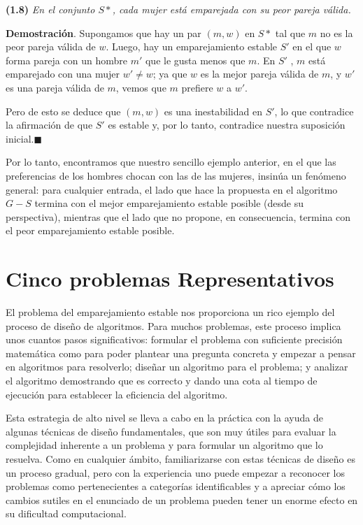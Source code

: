 \documentclass[a4paper, 12pt]{book}
\theoremstyle{dotless}
\begin{document}
\vspace{3mm}
\noindent\textbf{(1.8)} \textit{En el conjunto $S*$, cada mujer está emparejada con su peor pareja válida.}
\vspace{2mm}

\textbf{Demostración}. Supongamos que hay un par $(m, w)$ en $S*$ tal que $m$ no es la peor pareja válida de $w$. Luego, hay un emparejamiento estable $S'$ en el que $w$ forma pareja con un hombre $m'$ que le gusta menos que $m$. En $S'$ , $m$ está emparejado con una mujer $w'\neq w$; ya que $w$ es la mejor pareja válida de $m$, y $w'$ es una pareja válida de $m$, vemos que $m$ prefiere $w$ a $w'$.

Pero de esto se deduce que $(m, w)$ es una inestabilidad en $S'$, lo que contradice la afirmación de que $S'$ es estable y, por lo tanto, contradice nuestra suposición inicial.$ \blacksquare $

Por lo tanto, encontramos que nuestro sencillo ejemplo anterior, en el que las preferencias de los hombres chocan con las de las mujeres, insinúa un fenómeno general: para cualquier entrada, el lado que hace la propuesta en el algoritmo $G-S$ termina con el mejor emparejamiento estable posible (desde su perspectiva), mientras que el lado que no propone, en consecuencia, termina con el peor emparejamiento estable posible.

\section{Cinco problemas Representativos}

El problema del emparejamiento estable nos proporciona un rico ejemplo del proceso de diseño de algoritmos. Para muchos problemas, este proceso implica unos cuantos pasos significativos: formular el problema con suficiente precisión matemática como para poder plantear una pregunta concreta y empezar a pensar en algoritmos para resolverlo; diseñar un algoritmo para el problema; y analizar el algoritmo demostrando que es correcto y dando una cota al tiempo de ejecución para establecer la eficiencia del algoritmo.

Esta estrategia de alto nivel se lleva a cabo en la práctica con la ayuda de algunas técnicas de diseño fundamentales, que son muy útiles para evaluar la complejidad inherente a un problema y para formular un algoritmo que lo resuelva. Como en cualquier ámbito, familiarizarse con estas técnicas de diseño es un proceso gradual, pero con la experiencia uno puede empezar a reconocer los problemas como pertenecientes a categorías identificables y a apreciar cómo los cambios sutiles en el enunciado de un problema pueden tener un enorme efecto en su dificultad computacional.
\end{document}
